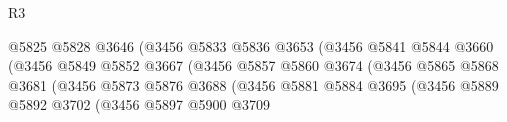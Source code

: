 \begin{lexlean}{R3}
\begin{coremodule}
                                                    @5825
                                                    @5828
                                                    @3646
                                                    (@3456
                                                      @5833
                                                      @5836
                                                      @3653
                                                      (@3456
                                                        @5841
                                                        @5844
                                                        @3660
                                                        (@3456
                                                          @5849
                                                          @5852
                                                          @3667
                                                          (@3456
                                                            @5857
                                                            @5860
                                                            @3674
                                                            (@3456
                                                              @5865
                                                              @5868
                                                              @3681
                                                              (@3456
                                                                @5873
                                                                @5876
                                                                @3688
                                                                (@3456
                                                                  @5881
                                                                  @5884
                                                                  @3695
                                                                  (@3456
                                                                    @5889
                                                                    @5892
                                                                    @3702
                                                                    (@3456
                                                                      @5897
                                                                      @5900
                                                                      @3709

\end{coremodule}
\end{lexlean}
